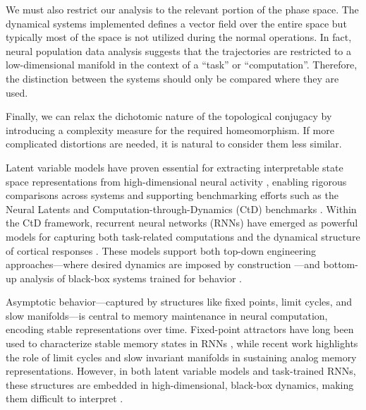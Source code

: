 \documentclass{article}
\theoremstyle{definition} \newtheorem{definition}{Definition}  \newtheorem{example}{Example}
\theoremstyle{remark} \newtheorem{remark}{Remark}
\newcounter{ct}
\begin{document}
We must also restrict our analysis to the relevant portion of the phase space.
The dynamical systems implemented defines a vector field over the entire space but typically most of the space is not utilized during the normal operations.
In fact, neural population data analysis suggests that the trajectories are restricted to a low-dimensional manifold in the context of a ``task'' or ``computation''.
Therefore, the distinction between the systems should only be compared where they are used.

Finally, we can relax the dichotomic nature of the topological conjugacy by introducing a complexity measure for the required homeomorphism.
If more complicated distortions are needed, it is natural to consider them less similar.



Latent variable models have proven essential for extracting interpretable state space representations from high-dimensional neural activity \citep{zoltowski2020general, Dowling2024b, pei2neural}, enabling rigorous comparisons across systems \citep{libedinsky2023comparing} and supporting benchmarking efforts such as the Neural Latents and Computation-through-Dynamics (CtD) benchmarks \citep{pei2neural, versteeg2025computation}.
Within the CtD framework, recurrent neural networks (RNNs) have emerged as powerful models for capturing both task-related computations \citep{yang2019task, yang2019multiple, yang2020artificial, sani2021nonlinearity} and the dynamical structure of cortical responses \citep{chaisangmongkon2017transience, mante2013context}.
These models support both top-down engineering approaches—where desired dynamics are imposed by construction \citep{eliasmith2003neuralengineering, eliasmith2005unified, eliasmith2010describe, pollock2020engineering,darshan2022learning, beiran2023rnns}—and bottom-up analysis of black-box systems trained for behavior \citep{sussillo2013blackbox, maheswaranathan2019reverse, golub2018fixedpointfinder, smith2021reverse, maheswaranathan2019universality, jarne2023initialization, nayebi2021heterogeneity, turner2021charting, turner2023simplicity, zhong2023mechanistic, huang2024measuring}.


Asymptotic behavior—captured by structures like fixed points, limit cycles, and slow manifolds—is central to memory maintenance in neural computation, encoding stable representations over time.
Fixed-point attractors have long been used to characterize stable memory states in RNNs \citep{sussillo2013blackbox, katz2017fibers, golub2018fixedpointfinder}, while recent work highlights the role of limit cycles \citep{townley2000existence, pals2024inferring} and slow invariant manifolds in sustaining analog memory representations\citep{Sagodi2024a}.
 However, in both latent variable models and task-trained RNNs, these structures are embedded in high-dimensional, black-box dynamics, making them difficult to interpret \citep{whiteway2019interpretable,kar2022interpretability}. %
\end{document}
